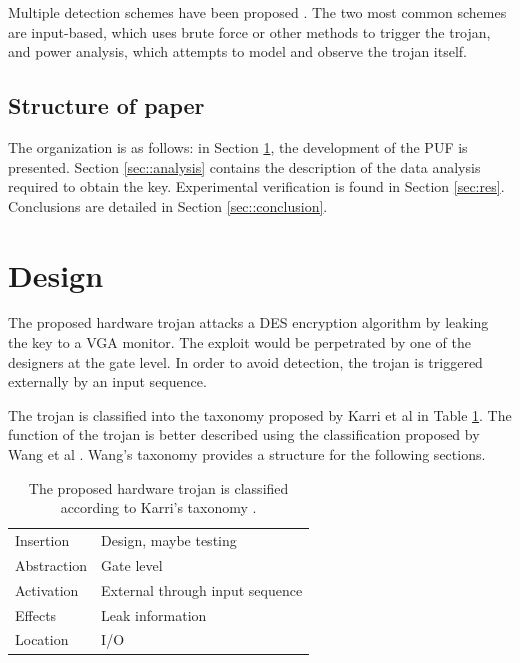	Multiple detection schemes have been proposed \cite{wolff2008towards,banga2009novel,jha2008randomization}. The two most common schemes are input-based, which uses brute force or other methods to trigger the trojan, and power analysis, which attempts to model and observe the trojan itself. 


\subsection{Structure of paper}
	The organization is as follows: in Section \ref{sec::des_impl}, the development of the PUF is presented.  
	Section \ref{sec::analysis} contains the description of the data analysis required to obtain the key. Experimental verification is found in Section \ref{sec:res}. Conclusions are detailed in Section \ref{sec::conclusion}. 


\section{Design} \label{sec::des_impl}
	The proposed hardware trojan attacks a DES encryption algorithm by leaking the key to a VGA monitor. The exploit would be perpetrated by one of the designers at the gate level. In order to avoid detection, the trojan is triggered externally by an input sequence. 

	The trojan is classified into the taxonomy proposed by Karri et al \cite{karri2010trustworthy} in Table \ref{tab:class}. The function of the trojan is better described using the classification proposed by Wang et al \cite{wang2008detecting}. Wang's taxonomy provides a structure for the following sections. 

	\begin{table}[htbp]
	  \centering
	  \caption{The proposed hardware trojan is classified according to Karri's taxonomy \cite{karri2010trustworthy}.}
	    \begin{tabular}{ll}
	    \toprule
	    Insertion  & Design, maybe testing \\
	    Abstraction & Gate level \\
	    Activation & External through input sequence \\
	    Effects    & Leak information \\
	    Location   & I/O \\
	    \bottomrule
	    \end{tabular}%
	  \label{tab:class}%
	\end{table}%

